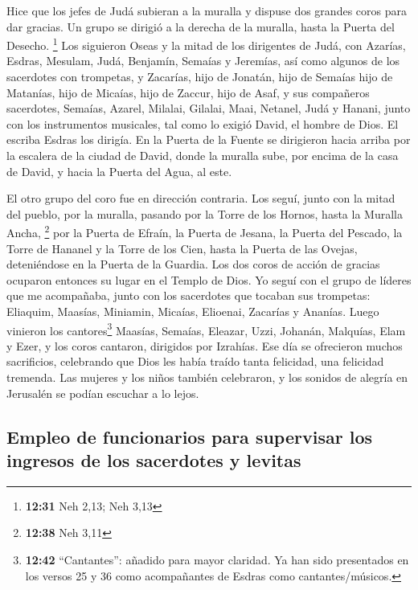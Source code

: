  Hice que los jefes de Judá subieran a la muralla y
dispuse dos grandes coros para dar gracias. Un grupo se dirigió a la
derecha de la muralla, hasta la Puerta del Desecho. \footnote{\textbf{12:31}
  Neh 2,13; Neh 3,13}  Los siguieron Oseas y la mitad de
los dirigentes de Judá,  con Azarías, Esdras, Mesulam,
 Judá, Benjamín, Semaías y Jeremías,  así
como algunos de los sacerdotes con trompetas, y Zacarías, hijo de
Jonatán, hijo de Semaías hijo de Matanías, hijo de Micaías, hijo de
Zaccur, hijo de Asaf,  y sus compañeros sacerdotes,
Semaías, Azarel, Milalai, Gilalai, Maai, Netanel, Judá y Hanani, junto
con los instrumentos musicales, tal como lo exigió David, el hombre de
Dios. El escriba Esdras los dirigía.  En la Puerta de la
Fuente se dirigieron hacia arriba por la escalera de la ciudad de David,
donde la muralla sube, por encima de la casa de David, y hacia la Puerta
del Agua, al este.

 El otro grupo del coro fue en dirección contraria. Los
seguí, junto con la mitad del pueblo, por la muralla, pasando por la
Torre de los Hornos, hasta la Muralla Ancha, \footnote{\textbf{12:38}
  Neh 3,11}  por la Puerta de Efraín, la Puerta de
Jesana, la Puerta del Pescado, la Torre de Hananel y la Torre de los
Cien, hasta la Puerta de las Ovejas, deteniéndose en la Puerta de la
Guardia.  Los dos coros de acción de gracias ocuparon
entonces su lugar en el Templo de Dios. Yo seguí con el grupo de líderes
que me acompañaba,  junto con los sacerdotes que tocaban
sus trompetas: Eliaquim, Maasías, Miniamin, Micaías, Elioenai, Zacarías
y Ananías.  Luego vinieron los cantores\footnote{\textbf{12:42}
  ``Cantantes'': añadido para mayor claridad. Ya han sido presentados en
  los versos 25 y 36 como acompañantes de Esdras como cantantes/músicos.}
Maasías, Semaías, Eleazar, Uzzi, Johanán, Malquías, Elam y Ezer, y los
coros cantaron, dirigidos por Izrahías.  Ese día se
ofrecieron muchos sacrificios, celebrando que Dios les había traído
tanta felicidad, una felicidad tremenda. Las mujeres y los niños también
celebraron, y los sonidos de alegría en Jerusalén se podían escuchar a
lo lejos.

\hypertarget{empleo-de-funcionarios-para-supervisar-los-ingresos-de-los-sacerdotes-y-levitas}{%
\subsection{Empleo de funcionarios para supervisar los ingresos de los
sacerdotes y
levitas}\label{empleo-de-funcionarios-para-supervisar-los-ingresos-de-los-sacerdotes-y-levitas}}

